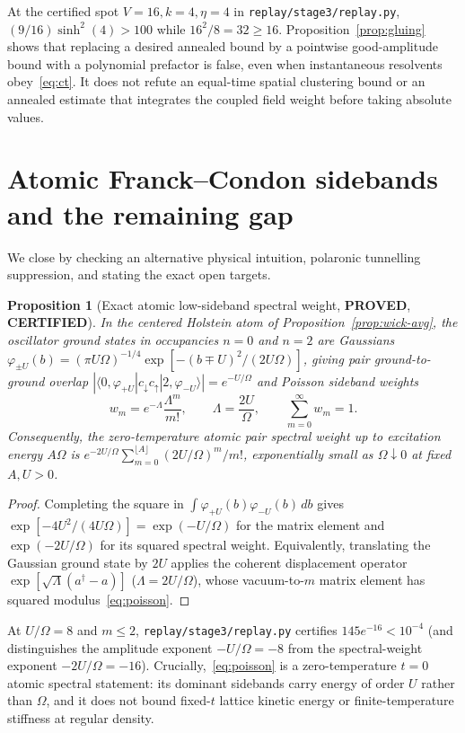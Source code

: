 \documentclass[11pt]{article}
\newtheorem{proposition}{Proposition}
\theoremstyle{remark}
\newcommand{\proved}{\textbf{PROVED}}
\newcommand{\certified}{\textbf{CERTIFIED}}
\begin{document}
At the certified spot $V=16,k=4,\eta=4$ in \texttt{replay/stage3/replay.py}, $(9/16)\sinh^2(4)>100$ while $16^2/8=32\ge 16$. Proposition~\ref{prop:gluing} shows that replacing a desired annealed bound by a pointwise good-amplitude bound with a polynomial prefactor is false, even when instantaneous resolvents obey~\eqref{eq:ct}. It does not refute an equal-time spatial clustering bound or an annealed estimate that integrates the coupled field weight before taking absolute values.

\section{Atomic Franck--Condon sidebands and the remaining gap}

We close by checking an alternative physical intuition, polaronic tunnelling suppression, and stating the exact open targets.

\begin{proposition}[Exact atomic low-sideband spectral weight, \proved, \certified]\label{prop:fc}
In the centered Holstein atom of Proposition~\ref{prop:wick-avg}, the oscillator ground states in occupancies $n=0$ and $n=2$ are Gaussians $\varphi_{\pm U}(b)=(\pi U\Omega)^{-1/4}\exp[-(b\mp U)^2/(2U\Omega)]$, giving pair ground-to-ground overlap $|\langle 0,\varphi_{+U}|c_\downarrow c_\uparrow|2,\varphi_{-U}\rangle|=e^{-U/\Omega}$ and Poisson sideband weights
\begin{equation}\label{eq:poisson}
 w_m=e^{-\Lambda}\frac{\Lambda^m}{m!},\qquad \Lambda=\frac{2U}{\Omega},\qquad \sum_{m=0}^\infty w_m=1.
\end{equation}
Consequently, the zero-temperature atomic pair spectral weight up to excitation energy $A\Omega$ is $e^{-2U/\Omega}\sum_{m=0}^{\lfloor A\rfloor}(2U/\Omega)^m/m!$, exponentially small as $\Omega\downarrow 0$ at fixed $A,U>0$.
\end{proposition}

\begin{proof}
Completing the square in $\int \varphi_{+U}(b)\varphi_{-U}(b)\,db$ gives $\exp[-4U^2/(4U\Omega)]=\exp(-U/\Omega)$ for the matrix element and $\exp(-2U/\Omega)$ for its squared spectral weight. Equivalently, translating the Gaussian ground state by $2U$ applies the coherent displacement operator $\exp[\sqrt{\Lambda}(a^\dagger-a)]$ ($\Lambda=2U/\Omega$), whose vacuum-to-$m$ matrix element has squared modulus~\eqref{eq:poisson}.
\end{proof}

At $U/\Omega=8$ and $m\le 2$, \texttt{replay/stage3/replay.py} certifies $145e^{-16}<10^{-4}$ (and distinguishes the amplitude exponent $-U/\Omega=-8$ from the spectral-weight exponent $-2U/\Omega=-16$). Crucially,~\eqref{eq:poisson} is a zero-temperature $t=0$ atomic spectral statement: its dominant sidebands carry energy of order $U$ rather than $\Omega$, and it does not bound fixed-$t$ lattice kinetic energy or finite-temperature stiffness at regular density.
\end{document}
